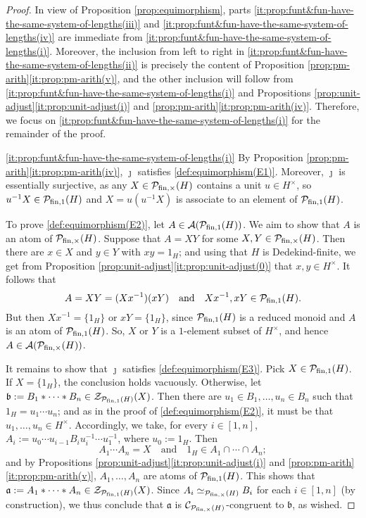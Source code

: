 \begin{proof}
	In view of Proposition \ref{prop:equimorphism}, parts \ref{it:prop:funt&fun-have-the-same-system-of-lengths(iii)} and \ref{it:prop:funt&fun-have-the-same-system-of-lengths(iv)} are immediate from \ref{it:prop:funt&fun-have-the-same-system-of-lengths(i)}.
	Moreover, the inclusion from left to right in \ref{it:prop:funt&fun-have-the-same-system-of-lengths(ii)} is precisely the content of Proposition \ref{prop:pm-arith}\ref{it:prop:pm-arith(v)}, and the other inclusion will follow from \ref{it:prop:funt&fun-have-the-same-system-of-lengths(i)} and Propositions \ref{prop:unit-adjust}\ref{it:prop:unit-adjust(i)} and \ref{prop:pm-arith}\ref{it:prop:pm-arith(iv)}.
	Therefore, we focus on \ref{it:prop:funt&fun-have-the-same-system-of-lengths(i)} for the remainder of the proof.
	
	\ref{it:prop:funt&fun-have-the-same-system-of-lengths(i)} By Proposition \ref{prop:pm-arith}\ref{it:prop:pm-arith(iv)}, $\jmath$ satisfies \ref{def:equimorphism(E1)}.
	Moreover, $\jmath$ is essentially surjective, as any $X\in \mathcal P_{\textrm{fin}, \times}(H)$ contains a unit $u \in H^\times$, so $u^{-1}X\in \mathcal P_{\textrm{fin}, 1}(H)$ and $X = u(u^{-1}X)$ is associate to an element of $\mathcal P_{\textrm{fin}, 1}(H)$. 

	To prove \ref{def:equimorphism(E2)}, let $A\in\mathcal{A}(\mathcal P_{\textrm{fin}, 1}(H))$.
	We aim to show that $A$ is an atom of $\mathcal P_{\textrm{fin}, \times}(H)$. Suppose that $A = XY$ for some $X,Y\in \mathcal P_{\textrm{fin}, \times}(H)$. Then there are $x \in X$ and $y \in Y$ with
	$xy=1_H$; and using that $H$ is Dedekind-finite, we get from Proposition \ref{prop:unit-adjust}\ref{it:prop:unit-adjust(0)} that $x,y\in H^\times$.
	It follows that 
	\[
	A = XY = (Xx^{-1})(xY)
	\quad\text{and}\quad
	Xx^{-1}, xY\in \mathcal P_{\textrm{fin}, 1}(H). 
	\]
	But then
	$Xx^{-1} = \{1_H\}$ or $xY = \{1_H\}$, since $\mathcal P_{\textrm{fin}, 1}(H)$ is a reduced monoid and $A$ is an atom of $\mathcal P_{\textrm{fin}, 1}(H)$.
	So, $X$ or $Y$ is a $1$-element subset of $H^\times$, and hence $A \in \mathcal{A}(\mathcal P_{\textrm{fin}, \times}(H))$. 
	 
	
	It remains to show that $\jmath$ satisfies \ref{def:equimorphism(E3)}.  Pick $X \in \mathcal P_{\textrm{fin}, 1}(H)$. If $X = \{1_H\}$, the conclusion holds vacuously. Otherwise, let $\mathfrak{b} := B_1*\cdots*B_n \in \mathcal Z_{\mathcal P_{\textrm{fin}, 1}(H)}(X)$. Then there are $u_1\in B_1,\ldots, u_n\in B_n$ such that $1_H = u_1\cdots u_n$; and as in the proof of \ref{def:equimorphism(E2)}, it must be that $u_1,\ldots, u_n\in H^\times$.
	Accordingly, we take, for every $i \in [ 1, n ]$, $A_i := u_0 \cdots u_{i-1} B_i u_i^{-1} \cdots u_1^{-1}$, where $u_0 := 1_H$.
	Then 
	\[
	A_1 \cdots A_n = X
	\quad\text{and}\quad
	1_H \in A_1 \cap \cdots \cap A_n;
	\]
	and by Propositions \ref{prop:unit-adjust}\ref{it:prop:unit-adjust(i)} and \ref{prop:pm-arith}\ref{it:prop:pm-arith(v)}, $A_1, \ldots, A_n$ are atoms of $\mathcal P_{{\textrm{fin}, 1}}(H)$. This shows that $\mathfrak{a}:= A_1*\cdots * A_n \in \mathcal{Z}_{\mathcal P_{\textrm{fin}, 1}(H)}(X)$. Since $A_i \simeq_{\mathcal P_{\textrm{fin}, \times}(H)} B_i$ for each $i \in [ 1, n ]$ (by construction), we thus conclude that $\mathfrak{a}$ is $\mathcal{C}_{\mathcal P_{{\textrm{fin}, \times}}(H)}$-congruent to $\mathfrak{b}$, as wished.
%	
\end{proof} 
